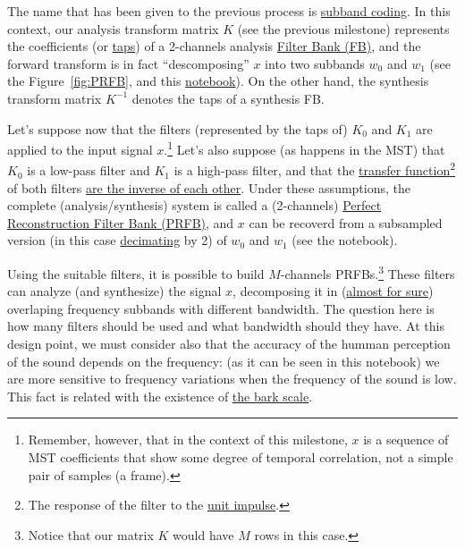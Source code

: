The name that has been given to the previous process is
\href{https://en.wikipedia.org/wiki/Sub-band_coding}{subband
  coding}. In this context, our analysis transform matrix $K$ (see the
previous milestone) represents the coefficients (or
\href{https://en.wikipedia.org/wiki/Finite_impulse_response}{taps}) of
a 2-channels analysis
\href{https://en.wikipedia.org/wiki/Filter_bank}{Filter Bank (FB)},
and the forward transform is in fact ``descomposing'' $x$ into two subbands
$w_0$ and $w_1$ (see the Figure~\ref{fig:PRFB}, and this
\href{}{notebook}). On the other hand, the synthesis transform matrix
$K^{-1}$ denotes the taps of a synthesis FB.

Let's suppose now that the filters (represented by the taps of) $K_0$
and $K_1$ are applied to the input signal $x$.\footnote{Remember,
  however, that in the context of this milestone, $x$ is a sequence of
  MST coefficients that show some degree of temporal correlation, not
  a simple pair of samples (a frame).} Let's also suppose (as happens
in the MST) that $K_0$ is a low-pass filter and $K_1$ is a high-pass
filter, and that the
\href{https://en.wikipedia.org/wiki/Filter_(signal_processing)#The_transfer_function}{transfer
  function}\footnote{The response of the filter to the
  \href{https://en.wikipedia.org/?title=Unit_impulse&redirect=no}{unit
    impulse}.} of both filters
\href{https://en.wikipedia.org/wiki/Filter_bank#Perfect_reconstruction_filter_banks}{are
  the inverse of each other}. Under these assumptions, the complete
(analysis/synthesis) system is called a (2-channels)
\href{https://en.wikipedia.org/wiki/Filter_bank#Perfect_reconstruction_filter_banks}{Perfect
  Reconstruction Filter Bank (PRFB)}, and $x$ can be recoverd from a
subsampled version (in this case
\href{https://en.wikipedia.org/wiki/Downsampling_(signal_processing)}{decimating}
by 2) of $w_0$ and $w_1$ (see the notebook).

Using the suitable filters, it is possible to build $M$-channels
PRFBs.\footnote{Notice that our matrix $K$ would have $M$ rows in this
  case.} These filters can analyze (and synthesize) the signal $x$,
decomposing it in
(\href{https://en.wikipedia.org/wiki/Low-pass_filter#Ideal_and_real_filters}{almost
  for sure}) overlaping frequency subbands with different
bandwidth. The question here is how many filters should be used and
what bandwidth should they have. At this design point, we must
consider also that the accuracy of the humman perception of the sound
depends on the frequency: (as it can be seen in this notebook) we are
more sensitive to frequency variations when the frequency of the sound
is low. This fact is related with the existence of
\href{https://en.wikipedia.org/wiki/Bark_scale}{the bark scale}.

